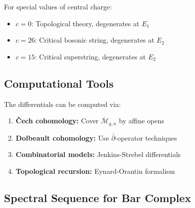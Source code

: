 \begin{theorem}[Degeneration at $E_2$]
For special values of central charge:
\begin{itemize}
\item $c = 0$: Topological theory, degenerates at $E_1$
\item $c = 26$: Critical bosonic string, degenerates at $E_2$  
\item $c = 15$: Critical superstring, degenerates at $E_2$
\end{itemize}
\end{theorem}

\subsection{Computational Tools}

The differentials can be computed via:
\begin{enumerate}
\item \textbf{Čech cohomology:} Cover $\overline{\mathcal{M}}_{g,n}$ by affine opens
\item \textbf{Dolbeault cohomology:} Use $\bar{\partial}$-operator techniques
\item \textbf{Combinatorial models:} Jenkins-Strebel differentials
\item \textbf{Topological recursion:} Eynard-Orantin formalism
\end{enumerate}

\subsection{Spectral Sequence for Bar Complex}

